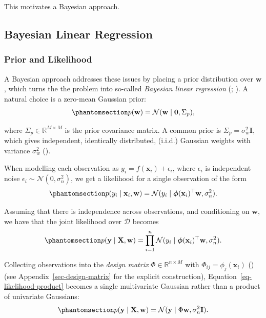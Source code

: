 \documentclass[
  letterpaper,
  DIV=11,
  numbers=noendperiod]{scrartcl}
\begin{document}
This motivates a Bayesian approach.

\subsection{Bayesian Linear
Regression}\label{bayesian-linear-regression}

\subsubsection{Prior and Likelihood}\label{prior-and-likelihood}

A Bayesian approach addresses these issues by placing a prior
distribution over \(\mathbf{w}\), which turns the the problem into
so-called \emph{Bayesian linear regression}
(;
). A natural
choice is a zero-mean Gaussian prior:
\begin{equation}\phantomsection\label{eq-weight-prior}{
p(\mathbf{w}) = \mathcal{N}(\mathbf{w} \mid \mathbf{0}, \Sigma_p),
}\end{equation}

where \(\Sigma_p \in \mathbb{R}^{M \times M}\) is the prior covariance
matrix. A common prior is \(\Sigma_p = \sigma_w^2 \mathbf{I}\), which
gives independent, identically distributed, (i.i.d.) Gaussian weights
with variance \(\sigma_w^2\) ().

When modelling each observation as
\(y_i = f(\mathbf{x}_i) + \epsilon_i\), where \(\epsilon_i\) is
independent noise \(\epsilon_i \sim \mathcal{N}(0, \sigma_n^2)\), we get
a likelihood for a single observation of the form
\begin{equation}\phantomsection\label{eq-likelihood}{
p(y_i \mid \mathbf{x}_i, \mathbf{w}) = \mathcal{N}(y_i \mid \boldsymbol{\phi}(\mathbf{x}_i)^\top \mathbf{w}, \sigma_n^2).
}\end{equation}

Assuming that there is independence across observations, and
conditioning on \(\mathbf{w}\), we have that the joint likelihood over
\(\mathcal{D}\) becomes
\begin{equation}\phantomsection\label{eq-likelihood-product}{
p(\mathbf{y} \mid \mathbf{X}, \mathbf{w}) = \prod_{i=1}^{n} \mathcal{N}(y_i \mid \boldsymbol{\phi}(\mathbf{x}_i)^\top \mathbf{w}, \sigma_n^2).
}\end{equation}

Collecting observations into the \emph{design matrix}
\(\Phi \in \mathbb{R}^{n \times M}\) with
\(\Phi_{ij} = \phi_j(\mathbf{x}_i)\)
()
(see Appendix~\ref{sec-design-matrix} for the explicit construction),
Equation~\ref{eq-likelihood-product} becomes a single multivariate
Gaussian rather than a product of univariate Gaussians:
\begin{equation}\phantomsection\label{eq-joint-likelihood}{
p(\mathbf{y} \mid \mathbf{X}, \mathbf{w}) = \mathcal{N}(\mathbf{y} \mid \Phi \mathbf{w}, \sigma_n^2 \mathbf{I}).
}\end{equation}
\end{document}

